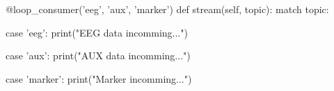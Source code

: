 \begin{python}
@loop_consumer('eeg', 'aux', 'marker')
def stream(self, topic):
    match topic:
    
        case 'eeg':
            print("EEG data incomming...")
            
        case 'aux':
            print("AUX data incomming...")

        case 'marker':
            print("Marker incomming...")
\end{python}